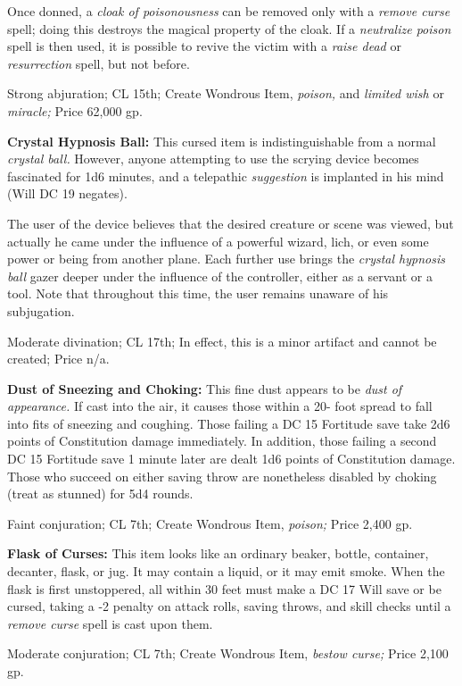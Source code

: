 \documentclass{article}
\begin{document}
Once donned, a \textit{cloak of poisonousness }can be removed only with a \textit{remove 
curse }spell; doing this destroys the magical property of the cloak. If a \textit{neutralize 
poison }spell is then used, it is possible to revive the victim with a \textit{raise 
dead }or \textit{resurrection }spell, but not before.

Strong abjuration; CL 15th; Create Wondrous Item, \textit{poison, }and \textit{limited 
wish }or \textit{miracle; }Price 62,000 gp.

\textbf{Crystal Hypnosis Ball:} This cursed item is indistinguishable from a normal 
\textit{crystal ball. }However, anyone attempting to use the scrying device becomes 
fascinated for 1d6 minutes, and a telepathic \textit{suggestion }is implanted in 
his mind (Will DC 19 negates).

The user of the device believes that the desired creature or scene was viewed, 
but actually he came under the influence of a powerful wizard, lich, or even some 
power or being from another plane. Each further use brings the \textit{crystal 
hypnosis ball }gazer deeper under the influence of the controller, either as a 
servant or a tool. Note that throughout this time, the user remains unaware of 
his subjugation.

Moderate divination; CL 17th; In effect, this is a minor artifact and cannot be 
created; Price n/a.

\textbf{Dust of Sneezing and Choking:} This fine dust appears to be \textit{dust 
of appearance. }If cast into the air, it causes those within a 20- foot spread 
to fall into fits of sneezing and coughing. Those failing a DC 15 Fortitude save 
take 2d6 points of Constitution damage immediately. In addition, those failing 
a second DC 15 Fortitude save 1 minute later are dealt 1d6 points of Constitution 
damage. Those who succeed on either saving throw are nonetheless disabled by choking 
(treat as stunned) for 5d4 rounds.

Faint conjuration; CL 7th; Create Wondrous Item, \textit{poison; }Price 2,400 gp.

\textbf{Flask of Curses:} This item looks like an ordinary beaker, bottle, container, 
decanter, flask, or jug. It may contain a liquid, or it may emit smoke. When the 
flask is first unstoppered, all within 30 feet must make a DC 17 Will save or be 
cursed, taking a -2 penalty on attack rolls, saving throws, and skill checks until 
a \textit{remove curse }spell is cast upon them.

Moderate conjuration; CL 7th; Create Wondrous Item, \textit{bestow curse; }Price 
2,100 gp.
\end{document}
